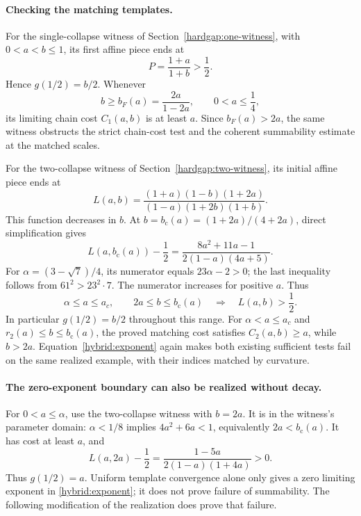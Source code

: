 \paragraph{Checking the matching templates.}
For the single-collapse witness of
Section~\ref{hardgap:one-witness}, with \(0<a<b\le1\), its first
affine piece ends at
\[
 P=\frac{1+a}{1+b}>\frac12.
\]
Hence \(g(1/2)=b/2\). Whenever
\[
 b\ge b_F(a)=\frac{2a}{1-2a},\qquad 0<a\le\frac14,
\]
its limiting chain cost \(C_1(a,b)\) is at least \(a\).
Since \(b_F(a)>2a\), the same witness obstructs the strict chain-cost
test and the coherent summability estimate at the matched scales.

For the two-collapse witness of
Section~\ref{hardgap:two-witness}, its initial affine piece ends at
\[
 L(a,b)=
 \frac{(1+a)(1-b)(1+2a)}
 {(1-a)(1+2b)(1+b)}.
\]
This function decreases in \(b\). At
\(b=b_{\mathrm c}(a)=(1+2a)/(4+2a)\), direct simplification gives
\[
 L(a,b_{\mathrm c}(a))-\frac12
 =\frac{8a^2+11a-1}{2(1-a)(4a+5)}.
\]
For \(\alpha=(3-\sqrt7)/4\), its numerator equals \(23\alpha-2>0\);
the last inequality follows from \(61^2>23^2\cdot7\).
The numerator increases for positive \(a\). Thus
\[
 \alpha\le a\le a_c,\qquad
 2a\le b\le b_{\mathrm c}(a)
 \quad\Longrightarrow\quad L(a,b)>\frac12.
\]
In particular \(g(1/2)=b/2\) throughout this range.
For \(\alpha<a\le a_c\) and
\(r_2(a)\le b\le b_{\mathrm c}(a)\), the proved matching cost
satisfies \(C_2(a,b)\ge a\), while \(b>2a\).
Equation~\eqref{hybrid:exponent} again makes both existing sufficient
tests fail on the same realized example, with their indices matched
by curvature.

\paragraph{The zero-exponent boundary can also be realized without decay.}
For \(0<a\le\alpha\), use the two-collapse witness with \(b=2a\).
It is in the witness's parameter domain: \(\alpha<1/8\) implies
\(4a^2+6a<1\), equivalently \(2a<b_{\mathrm c}(a)\).
It has cost at least \(a\), and
\[
 L(a,2a)-\frac12
 =\frac{1-5a}{2(1-a)(1+4a)}>0.
\]
Thus \(g(1/2)=a\). Uniform template convergence alone only gives a
zero limiting exponent in \eqref{hybrid:exponent}; it does not prove
failure of summability. The following modification of the realization
does prove that failure.

